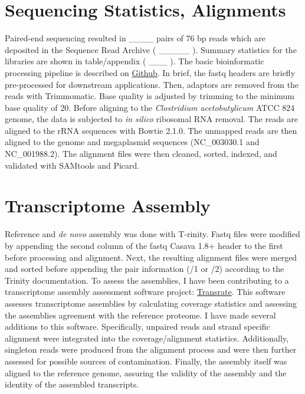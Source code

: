 \section{Sequencing Statistics, Alignments}
Paired-end sequencing resulted in ____ pairs of 76 bp reads which are deposited in the Sequence Read Archive ( _____ ). Summary statistics for the libraries are shown in table/appendix ( ___ ). The basic bioinformatic processing pipeline is described on \href{https://github.com/MatthewRalston/NGS_scripts}{Github}. In brief, the fastq headers are briefly pre-processed for downstream applications. Then, adaptors are removed from the reads with Trimmomatic\cite{47}. Base quality is adjusted by trimming to the minimum base quality of 20. Before aligning to the \textit{Clostridium acetobutylicum} ATCC 824 genome, the data is subjected to \textit{in silico} ribosomal RNA removal. The reads are aligned to the rRNA sequences with Bowtie 2.1.0\cite{17}. The unmapped reads are then aligned to the genome and megaplasmid sequences (NC_003030.1 and NC_001988.2). The alignment files were then cleaned, sorted, indexed, and validated with SAMtools\cite{19} and Picard\cite{40}.

\section{Transcriptome Assembly}
Reference and \textit{de novo} assembly was done with T-rinity\cite{58}. Fastq files were modified by appending the second column of the fastq Casava 1.8+ header to the first before processing and alignment. Next, the resulting alignment files were merged and sorted before appending the pair information (/1 or /2) according to the Trinity documentation. 
To assess the assemblies, I have been contributing to a transcriptome assembly assessment software project: \href{https://github.com/MatthewRalston/transrate}{Transrate}. This software assesses transcriptome assemblies by calculating coverage statistics and assessing the assemblies agreement with the reference proteome. I have made several additions to this software. Specifically, unpaired reads and strand specific alignment were integrated into the coverage/alignment statistics. Additionally, singleton reads were produced from the alignment process and were then further assessed for possible sources of contamination. Finally, the assembly itself was aligned to the reference genome, assuring the validity of the assembly and the identity of the assembled transcripts.


